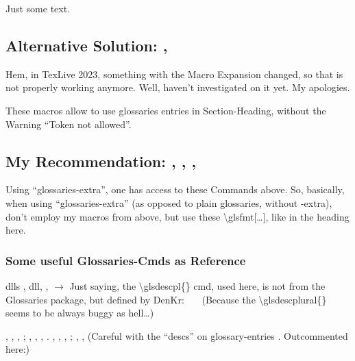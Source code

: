 Just some text.



\edef\tokenA{\glsentrytext{dll}}
\edef\tokenB{\glsentrydesc{dll}}
\subsection{Alternative Solution: \texorpdfstring{\tokenA}{DLL}, \texorpdfstring{\tokenB}{DLL}}
Hem, in TexLive 2023, something with the Macro Expansion changed, so that is not properly working anymore. Well, haven't investigated on it yet. My apologies.

These macros allow to use glossaries entries in Section-Heading, without the Warning \enquote{Token not allowed}.


\subsection{My Recommendation: 
, ,
, 
}

Using \enquote{glossaries-extra}, one has access to these Commands above.\nl
So, basically, when using \enquote{glossaries-extra} (as opposed to plain glossaries, without -extra), don't employ my macros from above, but use these \textbackslash glsfmt[\ldots], like in the heading here.


\subsubsection{Some useful Glossaries-Cmds as Reference}
\glspl{dll}\nl
{}, \glsdesc{dll}, ,\nl
$\rightarrow$ Just saying, the \textbackslash glsdescpl\{\} cmd, used here, is not from the Glossaries package, but defined by DenKr: %
\nl
\ \ \ (Because the \textbackslash glsdescplural\{\} seems to be always buggy as hell\ldots)

\npi
{}, , , ;\nl
{}, , , .\nl
{}, , , ;\nl
{}, , (Careful with the \enquote{descs} on glossary-entries . Outcommented here:)%

